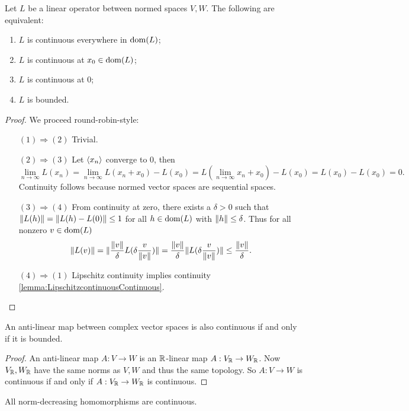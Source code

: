 \begin{theorem} \label{theorem:boundedLinearMaps}
Let $L$ be a linear operator between normed spaces $V,W$. The following are equivalent:
\begin{enumerate}
\item $L$ is continuous everywhere in $\operatorname{dom}(L)$;
\item $L$ is continuous at $x_0 \in \operatorname{dom}(L)$;
\item $L$ is continuous at $0$;
\item $L$ is bounded.
\end{enumerate}
\end{theorem}
\begin{proof}
We proceed round-robin-style:
\begin{itemize}[leftmargin=2cm]
\item[$\boxed{(1) \Rightarrow (2)}$] Trivial.
\item[$\boxed{(2) \Rightarrow (3)}$] Let $\langle x_n \rangle$ converge to $0$, then
\[ \lim_{n\to\infty}L(x_n) = \lim_{n\to\infty}L(x_n+x_0) - L(x_0) = L(\lim_{n\to\infty}x_n+x_0) - L(x_0) = L(x_0) - L(x_0) = 0. \]
Continuity follows because normed vector spaces are sequential spaces.
\item[$\boxed{(3) \Rightarrow (4)}$] From continuity at zero, there exists a $\delta>0$ such that $\lVert L(h)\rVert = \lVert L(h)-L(0)\rVert \leq 1$ for all $h\in \operatorname{dom}(L)$ with $\lVert h\rVert\leq \delta$. Thus for all nonzero $v\in \operatorname{dom}(L)$
\[ \lVert L(v)\rVert = \lVert\frac{\lVert v\rVert}{\delta}L(\delta \frac{v}{\lVert v\rVert})\rVert = \frac{\lVert v\rVert}{\delta}\lVert L(\delta \frac{v}{\lVert v\rVert})\rVert\leq \frac{\lVert v\rVert}{\delta}. \]
\item[$\boxed{(4) \Rightarrow (1)}$] Lipschitz continuity implies continuity \ref{lemma:LipschitzcontinuousContinuous}.
\end{itemize}
\end{proof}
\begin{corollary} \label{corollary:boundedAntiLinearMaps}
An anti-linear map between complex vector spaces is also continuous \textup{if and only if} it is bounded.
\end{corollary}
\begin{proof}
An anti-linear map $A:V\to W$ is an $\mathbb{R}$-linear map $A:V_{\mathbb{R}}\to W_{\mathbb{R}}$. Now $V_{\mathbb{R}}, W_{\mathbb{R}}$ have the same norms as $V,W$ and thus the same topology. So $A:V\to W$ is continuous if and only if $A:V_{\mathbb{R}}\to W_{\mathbb{R}}$ is continuous.
\end{proof}
\begin{corollary}
All norm-decreasing homomorphisms are continuous.
\end{corollary}

